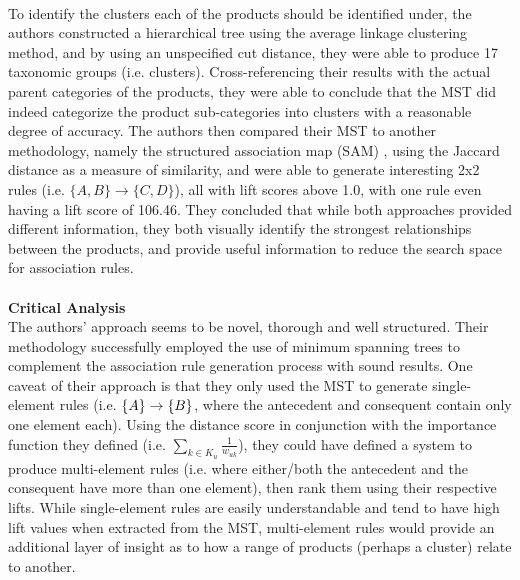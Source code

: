 \\
To identify the clusters each of the products should be identified under, the authors constructed a hierarchical tree using the average linkage clustering method, and by using an unspecified cut distance, they were able to produce 17 taxonomic groups (i.e. clusters). Cross-referencing their results with the actual parent categories of the products, they were able to conclude that the MST did indeed categorize the product sub-categories into clusters with a reasonable degree of accuracy. The authors then compared their MST to another methodology, namely the structured association map (SAM) , using the Jaccard distance as a measure of similarity,  and were able to generate interesting 2x2 rules (i.e. $\{A,B\}\rightarrow\{C, D\}$), all with lift scores above 1.0, with one rule even having a lift score of 106.46. They concluded that while both approaches provided different information, they both visually identify the strongest relationships between the products, and provide useful information to reduce the search space for association rules.
\\\\\textbf{Critical Analysis}\\
The authors' approach seems to be novel,  thorough and well structured.  Their methodology successfully employed the use of minimum spanning trees to complement the association rule generation process with sound results.  One caveat of their approach is that they only used the MST to generate single-element rules (i.e. $\{A\}\rightarrow\{B\}$, where the antecedent and consequent contain only one element each). Using the distance score in conjunction with the importance function they defined (i.e. $\sum\limits_{k \in K_u}^{} \frac{1}{w_{uk}}$), they could have defined a system to produce multi-element rules (i.e. where either/both the antecedent and the consequent have more than one element), then rank them using their respective lifts. While single-element rules are easily understandable and tend to have high lift values when extracted from the MST, multi-element rules would provide an additional layer of insight as to how a range of products (perhaps a cluster) relate to another.

